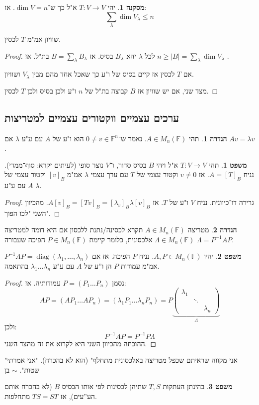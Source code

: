 \documentclass[a4paper]{article}
\DeclareMathOperator{\diag}    {diag}
\newcommand\F         {\mathbb{F}}
\newcommand\co        {\colon}
\newcommand\pms[1]    {\begin{pmatrix}
		#1
\end{pmatrix}}
\renewcommand\lg      {\lambda}
\newcommand\Lg        {\Lambda}
\newcommand\op    {^{-1}}
\theoremstyle{definition}
\newtheorem{Theorem}{משפט}
\newtheorem{definition}{הגדרה}
\newtheorem{Collary}{מסקנה}
\newcommand\cola [1] {\begin{Collary}#1\end{Collary}}
\newcommand\theo  [1] {\begin{Theorem}#1\end{Theorem}}
\newcommand\defi  [1] {\begin{definition}#1\end{definition}}
\begin{document}
	\cola{יהי $T \co V \to V$ א"ל כך ש־$\dim V = n$. אז: 
		\[ \sum_\lg \dim V_\lg \le n \]}
	שוויון אמ"מ $T$ לכסין. 
	
	\begin{proof}
		לכל $\lg$ יהא $B_\lg$ בסיס. אז $B = \sum_{\lg}B_\lg$ בת"ל. אז $n \ge |B| = \sum_\lg \dim V_\lg$ . 
		
		אם $T$ לכסין אז קיים בסיס של ו"ע כך שאכל אחד מהם מבין $V_\lg$ ושוויון. 
		
		מצד שני, אם יש שוויון אז $B$ קבוצה בת"ל של $n$ ו"ע ולכן בסיס ולכן $T$ לכסין. 
	\end{proof}
	
	\subsection{ערכים עצמיים ווקטורים עצמיים למטריצות}
	\defi{תהי $A \in M_n(\F)$. נאמר ש־$0 \neq v \in \F^n$ הוא ו"ע של $A$ עם ע"ע $\lg$ אם $Av = \lg v$. }
	
	\theo{תהי $T \co V \to V$ א"ל ויהי $B$ בסיס סדור, ו־$V$ נוצר סופי (לעיתים יקרא: סוף־ממדי). נניח $A = [T]_B$. אז $v \neq 0$ וקטור עצמי של $T$ עם ערך עצמי $\lg$ אמ"מ $[v]_B$ וקטור עצמי של $A$ עם ע"ע $\lg$. }
	
	\begin{proof}
		גרירה דו־כיוונית. 
		נניח $V$ ו"ע של $T$. אז $A[v]_B = [Tv]_B = [\lg_v]_B \lg[v]_B$. מהכיוון השני "לכו הפוך". 
	\end{proof}
	
	\defi{מטריצה $A \in M_n(\F)$ תקרא לכסינה/נתנת ללכסון אם היא דומה למטריצה $\Lambda \in M_n(\F)$ אלכסונית, כלומר קיימת $P \in M_n(\F)$ הפיכה שעבורה $\Lg = P\op AP$. }
	
	\theo{יהיו $A, P \in M_n(\F)$. נניח $P$ הפיכה. אז אם $P\op AP = \diag(\lg_1, \dots, \lg_n)$ אמ"מ עמודות $P$ הן ו''ע של $A$ עם ע"ע $\lg_1 \dots \lg_n$ בהתאמה. }
	
	\begin{proof}
		נסמן $P = (P_1 \dots P_n)$ עמודותיה. אז: 
		\[ AP = (AP_1 \dots AP_n) = (\lg_1P_1 \dots \lg_nP_n) = P\underbrace{\pms{\lg_1 && \\ & \ddots & \\ && \lg_n}}_{\Lg} \]
		ולכן: 
		\[ P\op AP = P\op P\Lg \]
		ההוכחה מהכיוון השני היא לקרוא את זה מהצד השני. 
	\end{proof}
	
	"אני מקווה שראיתם שכפל מטריצה באלכסונית מתחלף" (הוא לא בהכרח). 
	"אני אמרתי שטות". $\sim$ בן 
	
	\theo{בהינתן העתקות $T, S$ שתיהן לכסינות לפי אותו הבסיס $B$ (לא בהכרח אותם הע''עים), אז $TS = ST$ מתחלפות. }
	
\end{document}
